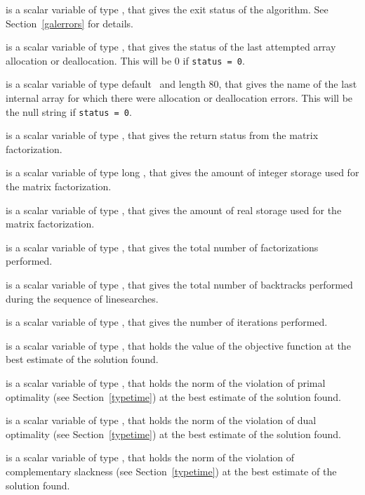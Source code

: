 \begin{description}

 is a scalar variable of type \integer, that gives the
exit status of the algorithm.
See Section~\ref{galerrors}
for details.

 is a scalar variable of type \integer, that gives
the status of the last attempted array allocation or deallocation.
This will be 0 if {\tt status = 0}.

 is a scalar variable of type default \character\
and length 80, that  gives the name of the last internal array
for which there were allocation or deallocation errors.
This will be the null string if {\tt status = 0}.

 is a scalar variable of type \integer, that
gives the return status from the matrix factorization.

 is a scalar variable of type long
\integer, that gives the amount of integer storage used for the matrix
factorization.

 is a scalar variable of type \longinteger,
that gives the amount of real storage used for the matrix factorization.

 is a scalar variable of type \integer, that gives the
total number of factorizations performed.

 is a scalar variable of type \integer, that gives the
total number of backtracks performed during the sequence of linesearches.

 is a scalar variable of type \integer, that
gives the number of iterations performed.

 is a scalar variable of type \realdp, that holds the
value of the objective function at the best estimate of the solution found.

 is a scalar variable of type \realdp,
that holds the norm of the violation of primal optimality
(see Section~\ref{typetime}) at the best estimate of the solution found.

 is a scalar variable of type \realdp,
that holds the norm of the violation of dual optimality
(see Section~\ref{typetime}) at the best estimate of the solution found.

is a scalar variable of type \realdp,
that holds the norm of the violation of complementary slackness
(see Section~\ref{typetime}) at the best estimate of the solution found.


\end{description}
